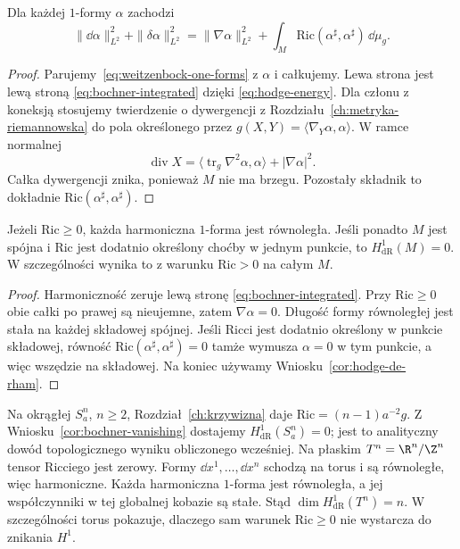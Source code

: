 \begin{stwierdzenie}
\label{prop:bochner-integrated}
Dla każdej $1$-formy $\alpha$ zachodzi
\begin{equation}\label{eq:bochner-integrated}
 \|\dd\alpha\|_{L^2}^2+\|\delta\alpha\|_{L^2}^2
 =\|\nabla\alpha\|_{L^2}^2
  +\int_M\mathrm{Ric}(\alpha^\sharp,\alpha^\sharp)
                       \,\dd\mu_g.
\end{equation}
\end{stwierdzenie}
\begin{proof}
Parujemy~\eqref{eq:weitzenbock-one-forms} z $\alpha$
i całkujemy. Lewa strona jest lewą stroną
\eqref{eq:bochner-integrated} dzięki
\eqref{eq:hodge-energy}. Dla członu z koneksją
stosujemy twierdzenie o dywergencji z
Rozdziału~\ref{ch:metryka-riemannowska} do pola
określonego przez $g(X,Y)=\langle\nabla_Y\alpha,\alpha\rangle$.
W ramce normalnej
\[
 \operatorname{div}X
 =\langle\operatorname{tr}_g\nabla^2\alpha,\alpha\rangle
  +|\nabla\alpha|^2.
\]
Całka dywergencji znika, ponieważ $M$ nie ma brzegu.
Pozostały składnik to dokładnie
$\mathrm{Ric}(\alpha^\sharp,\alpha^\sharp)$.
\end{proof}

\begin{wniosek}
\label{cor:bochner-vanishing}
Jeżeli $\mathrm{Ric}\geq0$, każda harmoniczna $1$-forma
jest równoległa. Jeśli ponadto $M$ jest spójna i
$\mathrm{Ric}$ jest dodatnio określony choćby w jednym
punkcie, to $H^1_{\mathrm{dR}}(M)=0$.
W szczególności wynika to z warunku $\mathrm{Ric}>0$
na całym $M$.
\end{wniosek}
\begin{proof}
Harmoniczność zeruje lewą stronę
\eqref{eq:bochner-integrated}. Przy $\mathrm{Ric}\geq0$
obie całki po prawej są nieujemne, zatem
$\nabla\alpha=0$. Długość formy równoległej jest
stała na każdej składowej spójnej. Jeśli Ricci jest
dodatnio określony w punkcie składowej, równość
$\mathrm{Ric}(\alpha^\sharp,\alpha^\sharp)=0$ tamże
wymusza $\alpha=0$ w tym punkcie, a więc wszędzie
na składowej. Na koniec używamy
Wniosku~\ref{cor:hodge-de-rham}.
\end{proof}

\begin{przyklad}
Na okrągłej $S_a^n$, $n\geq2$, Rozdział~\ref{ch:krzywizna}
daje $\mathrm{Ric}=(n-1)a^{-2}g$.
Z Wniosku~\ref{cor:bochner-vanishing} dostajemy
$H^1_{\mathrm{dR}}(S_a^n)=0$; jest to analityczny
dowód topologicznego wyniku obliczonego wcześniej.
Na płaskim $T^n=\R^n/\Z^n$ tensor Ricciego jest
zerowy. Formy $\dd x^1,\ldots,\dd x^n$ schodzą na torus
i są równoległe, więc harmoniczne. Każda harmoniczna
$1$-forma jest równoległa, a jej współczynniki w tej
globalnej kobazie są stałe. Stąd
$\dim H^1_{\mathrm{dR}}(T^n)=n$.
W szczególności torus pokazuje, dlaczego sam warunek
$\mathrm{Ric}\geq0$ nie wystarcza do znikania $H^1$.
\end{przyklad}

